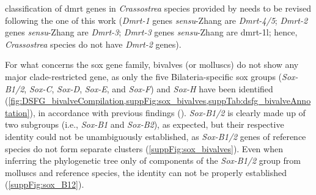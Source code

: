 classification of \gls{dmrt} genes in \textit{Crassostrea} species provided by  needs to be revised following the one of this work (\textit{Dmrt-1} genes \textit{sensu}-Zhang are \textit{Dmrt-4/5}; \textit{Dmrt-2} genes \textit{sensu}-Zhang are \textit{Dmrt-3}; \textit{Dmrt-3} genes \textit{sensu}-Zhang are \gls{dmrt-1l}; hence, \textit{Crassostrea} species do not have \textit{Dmrt-2} genes).

For what concerns the \gls{sox} gene family, bivalves (or molluscs) do not show any major clade-restricted gene, as only the five Bilateria-specific \gls{sox} groups (\textit{Sox-B1/2}, \textit{Sox-C}, \textit{Sox-D}, \textit{Sox-E}, and \textit{Sox-F}) and \textit{Sox-H} have been identified (\cref{fig:DSFG_bivalveCompilation,suppFig:sox_bivalves,suppTab:dsfg_bivalveAnnotation}), in accordance with previous findings (). \textit{Sox-B1/2} is clearly made up of two subgroups (i.e., \textit{Sox-B1} and \textit{Sox-B2}), as expected, but their respective identity could not be unambiguously established, as \textit{Sox-B1/2} genes of reference species do not form separate clusters (\cref{suppFig:sox_bivalves}). Even when inferring the phylogenetic tree only of components of the \textit{Sox-B1/2} group from molluscs and reference species, the identity can not be properly established (\cref{suppFig:sox_B12}).

